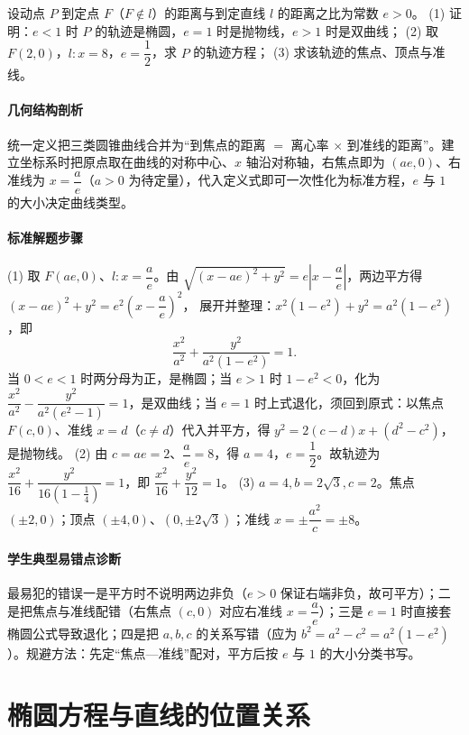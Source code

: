 \begin{problem}
设动点 $P$ 到定点 $F$（$F\notin l$）的距离与到定直线 $l$ 的距离之比为常数 $e>0$。
(1) 证明：$e<1$ 时 $P$ 的轨迹是椭圆，$e=1$ 时是抛物线，$e>1$ 时是双曲线；
(2) 取 $F(2,0)$，$l:x=8$，$e=\dfrac12$，求 $P$ 的轨迹方程；
(3) 求该轨迹的焦点、顶点与准线。
\end{problem}
\begin{solution}
\paragraph{几何结构剖析}
统一定义把三类圆锥曲线合并为“到焦点的距离 $=$ 离心率 $\times$ 到准线的距离”。建立坐标系时把原点取在曲线的对称中心、$x$ 轴沿对称轴，右焦点即为 $(ae,0)$、右准线为 $x=\dfrac ae$（$a>0$ 为待定量），代入定义式即可一次性化为标准方程，$e$ 与 $1$ 的大小决定曲线类型。
\paragraph{标准解题步骤}
(1) 取 $F(ae,0)$、$l:x=\dfrac ae$。由 $\sqrt{(x-ae)^2+y^2}=e\left|x-\dfrac ae\right|$，两边平方得
$(x-ae)^2+y^2=e^2\left(x-\dfrac ae\right)^2$，
展开并整理：$x^2(1-e^2)+y^2=a^2(1-e^2)$，即
$$\frac{x^2}{a^2}+\frac{y^2}{a^2(1-e^2)}=1.$$
当 $0<e<1$ 时两分母为正，是椭圆；当 $e>1$ 时 $1-e^2<0$，化为 $\dfrac{x^2}{a^2}-\dfrac{y^2}{a^2(e^2-1)}=1$，是双曲线；当 $e=1$ 时上式退化，须回到原式：以焦点 $F(c,0)$、准线 $x=d$（$c\ne d$）代入并平方，得 $y^2=2(c-d)x+(d^2-c^2)$，是抛物线。
(2) 由 $c=ae=2$、$\dfrac ae=8$，得 $a=4$，$e=\dfrac12$。故轨迹为
$\dfrac{x^2}{16}+\dfrac{y^2}{16\left(1-\frac14\right)}=1$，即 $\dfrac{x^2}{16}+\dfrac{y^2}{12}=1$。
(3) $a=4,b=2\sqrt3,c=2$。焦点 $(\pm2,0)$；顶点 $(\pm4,0)$、$(0,\pm2\sqrt3)$；准线 $x=\pm\dfrac{a^2}{c}=\pm8$。
\paragraph{学生典型易错点诊断}
最易犯的错误一是平方时不说明两边非负（$e>0$ 保证右端非负，故可平方）；二是把焦点与准线配错（右焦点 $(c,0)$ 对应右准线 $x=\dfrac ae$）；三是 $e=1$ 时直接套椭圆公式导致退化；四是把 $a,b,c$ 的关系写错（应为 $b^2=a^2-c^2=a^2(1-e^2)$）。规避方法：先定“焦点—准线”配对，平方后按 $e$ 与 $1$ 的大小分类书写。
\end{solution}

\section{椭圆方程与直线的位置关系}

